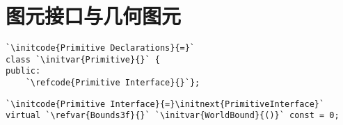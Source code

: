 \section{图元接口与几何图元}\label{sec:图元接口与几何图元}

\begin{lstlisting}
`\initcode{Primitive Declarations}{=}`
class `\initvar{Primitive}{}` {
public:
    `\refcode{Primitive Interface}{}`};
\end{lstlisting}

\begin{lstlisting}
`\initcode{Primitive Interface}{=}\initnext{PrimitiveInterface}`
virtual `\refvar{Bounds3f}{}` `\initvar{WorldBound}{()}` const = 0;
\end{lstlisting}